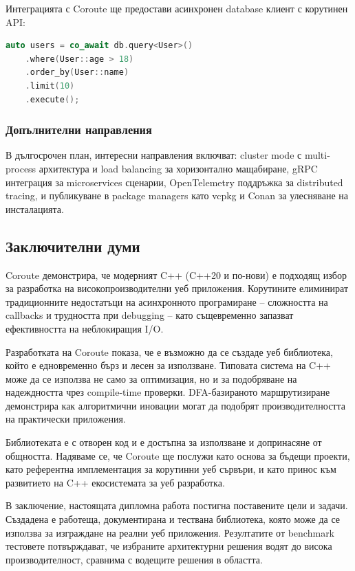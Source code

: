 Интеграцията с Coroute ще предостави асинхронен database клиент с корутинен API:
\begin{lstlisting}[language=C++, basicstyle=\small\ttfamily]
auto users = co_await db.query<User>()
    .where(User::age > 18)
    .order_by(User::name)
    .limit(10)
    .execute();
\end{lstlisting}

\subsubsection{Допълнителни направления}

В дългосрочен план, интересни направления включват: cluster mode с multi-process архитектура и load balancing за хоризонтално мащабиране, gRPC интеграция за microservices сценарии, OpenTelemetry поддръжка за distributed tracing, и публикуване в package managers като vcpkg и Conan за улесняване на инсталацията.

\subsection{Заключителни думи}

Coroute демонстрира, че модерният C++ (C++20 и по-нови) е подходящ избор за разработка на високопроизводителни уеб приложения. Корутините елиминират традиционните недостатъци на асинхронното програмиране -- сложността на callbacks и трудността при debugging -- като същевременно запазват ефективността на неблокиращия I/O.

Разработката на Coroute показа, че е възможно да се създаде уеб библиотека, който е едновременно бърз и лесен за използване. Типовата система на C++ може да се използва не само за оптимизация, но и за подобряване на надеждността чрез compile-time проверки. DFA-базираното маршрутизиране демонстрира как алгоритмични иновации могат да подобрят производителността на практически приложения.

Библиотеката е с отворен код и е достъпна за използване и допринасяне от общността. Надяваме се, че Coroute ще послужи като основа за бъдещи проекти, като референтна имплементация за корутинни уеб сървъри, и като принос към развитието на C++ екосистемата за уеб разработка.

В заключение, настоящата дипломна работа постигна поставените цели и задачи. Създадена е работеща, документирана и тествана библиотека, която може да се използва за изграждане на реални уеб приложения. Резултатите от benchmark тестовете потвърждават, че избраните архитектурни решения водят до висока производителност, сравнима с водещите решения в областта.
